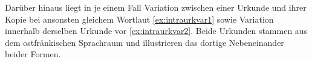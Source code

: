 
Darüber hinaus liegt in je einem Fall Variation zwischen einer Urkunde und
ihrer Kopie bei ansonsten gleichem Wortlaut \cref{ex:intraurkvar1} sowie
Variation innerhalb derselben Urkunde vor \cref{ex:intraurkvar2}. Beide
Urkunden stammen aus dem ostfränkischen Sprachraum und illustrieren das dortige
Neben\-einander beider Formen.

